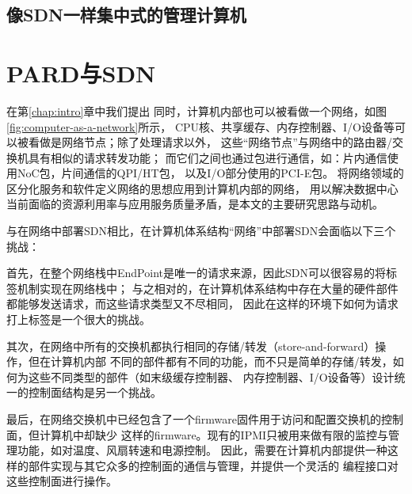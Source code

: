 \subsection{像SDN一样集中式的管理计算机}

\section{PARD与SDN}

在第\ref{chap:intro}章中我们提出
同时，计算机内部也可以被看做一个网络，如图\ref{fig:computer-as-a-network}所示，
CPU核、共享缓存、内存控制器、I/O设备等可以被看做是网络节点；除了处理请求以外，
这些“网络节点”与网络中的路由器/交换机具有相似的请求转发功能；
而它们之间也通过包进行通信，如：片内通信使用NoC包，片间通信的QPI/HT包，
以及I/O部分使用的PCI-E包。
将网络领域的区分化服务和软件定义网络的思想应用到计算机内部的网络，
用以解决数据中心当前面临的资源利用率与应用服务质量矛盾，是本文的主要研究思路与动机。

与在网络中部署SDN相比，在计算机体系结构“网络”中部署SDN会面临以下三个挑战：

首先，在整个网络栈中EndPoint是唯一的请求来源，因此SDN可以很容易的将标签机制实现在网络栈中；
与之相对的，在计算机体系结构中存在大量的硬件部件都能够发送请求，而这些请求类型又不尽相同，
因此在这样的环境下如何为请求打上标签是一个很大的挑战。

其次，在网络中所有的交换机都执行相同的存储/转发（store-and-forward）操作，但在计算机内部
不同的部件都有不同的功能，而不只是简单的存储/转发，如何为这些不同类型的部件（如末级缓存控制器、
内存控制器、I/O设备等）设计统一的控制面结构是另一个挑战。

最后，在网络交换机中已经包含了一个firmware固件用于访问和配置交换机的控制面，但计算机中却缺少
这样的firmware。现有的IPMI只被用来做有限的监控与管理功能，如对温度、风扇转速和电源控制。
因此，需要在计算机内部提供一种这样的部件实现与其它众多的控制面的通信与管理，并提供一个灵活的
编程接口对这些控制面进行操作。


